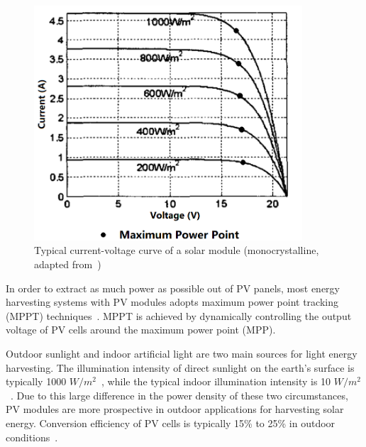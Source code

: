 \begin{figure}[!htb]
    \centering
    \includegraphics[width=10cm]{ch2_review/figures/solar_vi}
    \caption{Typical current-voltage curve of a solar module (monocrystalline, adapted from~\cite{xiao2004novel})}
    \label{Figure:solar_vi}
\end{figure}

In order to extract as much power as possible out of PV panels, most energy harvesting systems with PV modules adopts maximum power point tracking (MPPT) techniques~\cite{lopez2010new, paz2016high, verma2016maximum}. MPPT is achieved by dynamically controlling the output voltage of PV cells around the maximum power point (MPP).

Outdoor sunlight and indoor artificial light are two main sources for light energy harvesting. The illumination intensity of direct sunlight on the earth's surface is typically 1000 $W/m^2$~\cite{roundy2004power}, while the typical indoor illumination intensity is 10 $W/m^2$~\cite{shaikh2016energy}. Due to this large difference in the power density of these two circumstances, PV modules are more prospective in outdoor applications for harvesting solar energy. Conversion efficiency of PV cells is typically 15\% to 25\% in outdoor conditions~\cite{mathuna2008energy}.  

